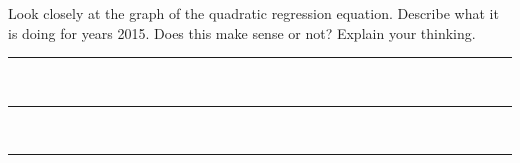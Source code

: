 \vspace{1\onelineskip}

\noindent 
Look closely at the graph of the quadratic regression equation. 
Describe what it is doing for years  2015. 
Does this make sense or not? 
Explain your thinking.\\[0.65\onelineskip]

\noindent\rule[\onelineskip]{\textwidth}{0.4pt}\\[0.65\onelineskip]
\noindent\rule[\onelineskip]{\textwidth}{0.4pt}\\[0.65\onelineskip]
\noindent\rule[\onelineskip]{\textwidth}{0.4pt}
